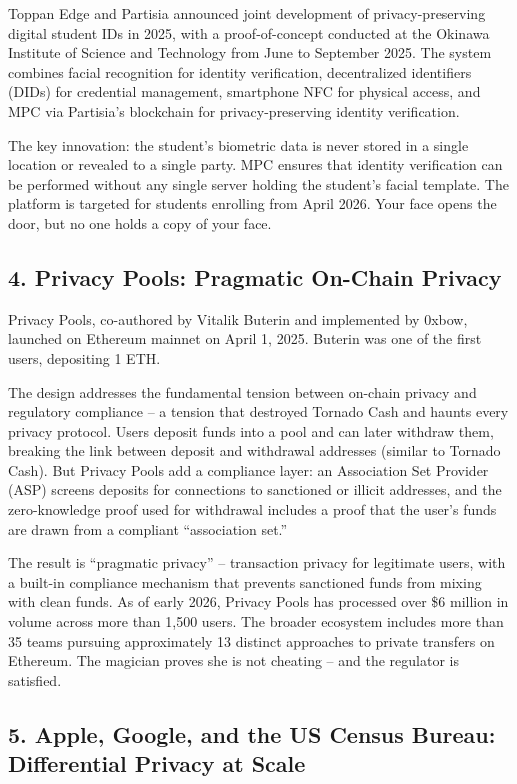 \documentclass[
  11pt,
  openany]{report}
\begin{document}
Toppan Edge and Partisia announced joint development of privacy-preserving
digital student IDs in 2025, with a proof-of-concept conducted at the Okinawa
Institute of Science and Technology from June to September 2025. The system
combines facial recognition for identity verification, decentralized identifiers
(DIDs) for credential management, smartphone NFC for physical access, and MPC
via Partisia's blockchain for privacy-preserving identity verification.

The key innovation: the student's biometric data is never stored in a single
location or revealed to a single party. MPC ensures that identity verification
can be performed without any single server holding the student's facial
template. The platform is targeted for students enrolling from April 2026. Your
face opens the door, but no one holds a copy of your face.

\subsection{4. Privacy Pools: Pragmatic On-Chain
Privacy}\label{privacy-pools-pragmatic-on-chain-privacy}

Privacy Pools, co-authored by Vitalik Buterin and implemented by 0xbow, launched
on Ethereum mainnet on April 1, 2025. Buterin was one of the first users,
depositing 1 ETH.

The design addresses the fundamental tension between on-chain privacy and
regulatory compliance -- a tension that destroyed Tornado Cash and haunts every
privacy protocol. Users deposit funds into a pool and can later withdraw them,
breaking the link between deposit and withdrawal addresses (similar to Tornado
Cash). But Privacy Pools add a compliance layer: an Association Set Provider
(ASP) screens deposits for connections to sanctioned or illicit addresses, and
the zero-knowledge proof used for withdrawal includes a proof that the user's
funds are drawn from a compliant ``association set.''

The result is ``pragmatic privacy'' -- transaction privacy for legitimate users,
with a built-in compliance mechanism that prevents sanctioned funds from mixing
with clean funds. As of early 2026, Privacy Pools has processed over \$6 million
in volume across more than 1,500 users. The broader ecosystem includes more than
35 teams pursuing approximately 13 distinct approaches to private transfers on
Ethereum. The magician proves she is not cheating -- and the regulator is
satisfied.

\subsection{5. Apple, Google, and the US Census Bureau: Differential Privacy at
Scale}\label{apple-google-and-the-us-census-bureau-differential-privacy-at-scale}
\end{document}
